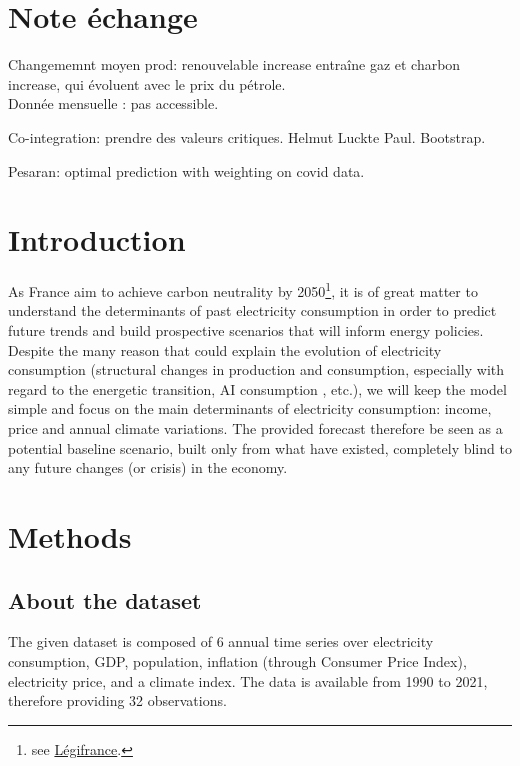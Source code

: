 \section{Note échange}
\label{theorie}
Changememnt moyen prod: renouvelable increase entraîne gaz et charbon increase, qui évoluent avec le prix du pétrole. \\

Donnée mensuelle : pas accessible. 

Co-integration: prendre des valeurs critiques. Helmut Luckte Paul. Bootstrap. 

Pesaran: optimal prediction with weighting on covid data.
 

\newpage

\section{Introduction}
As France aim to achieve carbon neutrality by 2050\footnote{see \href{https://www.legifrance.gouv.fr/jorf/id/JORFTEXT000041814459}{Légifrance}.}, it is of great matter to understand the determinants of past electricity consumption in order to predict future trends and build prospective scenarios that will inform energy policies. Despite the many reason that could explain the evolution of electricity consumption (structural changes in production and consumption, especially with regard to the energetic transition, AI consumption \cite{de2023growing}, etc.), we will keep the model simple and focus on the main determinants of electricity consumption: income, price and annual climate variations. The provided forecast therefore be seen as a potential baseline scenario, built only from what have existed, completely blind to any future changes (or crisis) in the economy.

\section{Methods}

\subsection{About the dataset}

The given dataset is composed of 6 annual time series over electricity consumption, GDP, population, inflation (through Consumer Price Index), electricity price, and a climate index. The data is available from 1990 to 2021, therefore providing 32 observations. 

